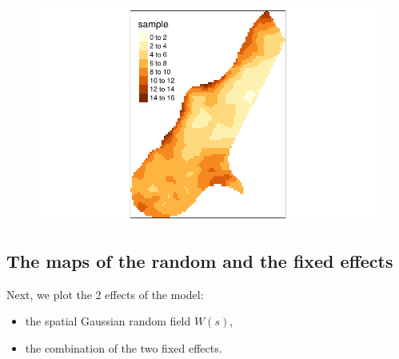 \documentclass[
  a4paper,
]{article}
\begin{document}
\begin{figure}[H]

{\centering \includegraphics{pedometron_files/figure-pdf/unnamed-chunk-14-1.pdf}

}

\end{figure}

\hypertarget{the-maps-of-the-random-and-the-fixed-effects}{%
\subsection{The maps of the random and the fixed
effects}\label{the-maps-of-the-random-and-the-fixed-effects}}

Next, we plot the 2 effects of the model:

\begin{itemize}
\item
  the spatial Gaussian random field \(W(s)\),
\item
  the combination of the two fixed effects.
\end{itemize}
\end{document}
